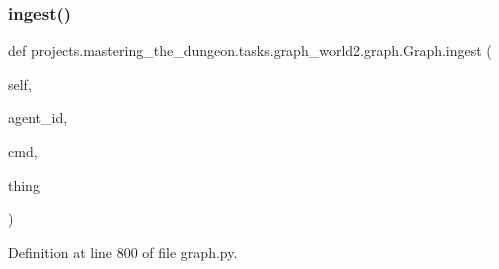 \subsubsection{\texorpdfstring{ingest()}{ingest()}}
{\footnotesize\ttfamily def projects.\+mastering\+\_\+the\+\_\+dungeon.\+tasks.\+graph\+\_\+world2.\+graph.\+Graph.\+ingest (\begin{DoxyParamCaption}\item[{}]{self,  }\item[{}]{agent\+\_\+id,  }\item[{}]{cmd,  }\item[{}]{thing }\end{DoxyParamCaption})}



Definition at line 800 of file graph.\+py.


